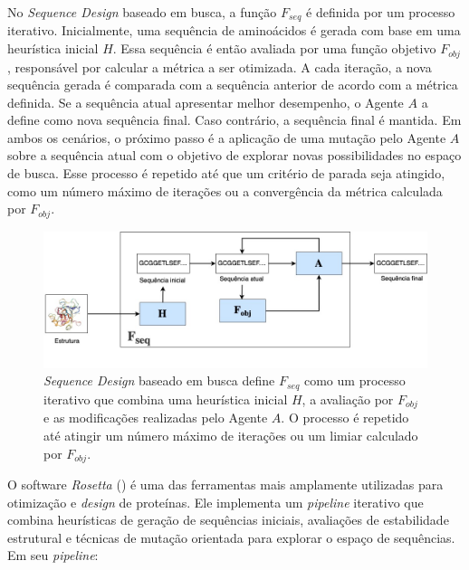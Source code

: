 
No \textit{Sequence Design} baseado em busca, 
a função $F_{seq}$ é definida por um processo iterativo. 
Inicialmente, uma sequência de aminoácidos é gerada com base em uma heurística inicial $H$.
Essa sequência é então avaliada por uma função objetivo $F_{obj}$, 
responsável por calcular a métrica a ser otimizada.
A cada iteração, 
a nova sequência gerada é comparada com a sequência anterior de acordo com a métrica definida. 
Se a sequência atual apresentar melhor desempenho, o Agente $A$ a define como nova sequência final.
Caso contrário, a sequência final é mantida. 
Em ambos os cenários, o próximo passo é a aplicação de uma mutação pelo Agente $A$ sobre 
a sequência atual com o objetivo de explorar novas possibilidades no espaço de busca.
Esse processo é repetido até que um critério de parada seja atingido, 
como um número máximo de iterações ou a convergência da métrica calculada por $F_{obj}$.


\begin{figure}[H]
  \centering
  \includegraphics[width=.8\textwidth]{figuras/metodologia-SearchBased.jpg}
  \caption[\textit{Sequence Design} baseado em busca]{\textit{Sequence Design} baseado em busca define $F_{seq}$ 
           como um processo iterativo que combina uma 
           heurística inicial $H$, a avaliação por $F_{obj}$ e as modificações realizadas pelo Agente $A$. 
           O processo é repetido até atingir um número máximo de iterações ou um limiar calculado por $F_{obj}$.}
  \label{fig:seqdes_search_based}
\end{figure}

O software \textit{Rosetta} (\cite{Rosetta}) é uma das ferramentas 
mais amplamente utilizadas para otimização e \textit{design} de proteínas.
Ele implementa um \textit{pipeline} iterativo que combina heurísticas de geração de sequências iniciais, 
avaliações de estabilidade estrutural e técnicas de mutação orientada para explorar o espaço de sequências.
Em seu \textit{pipeline}:


